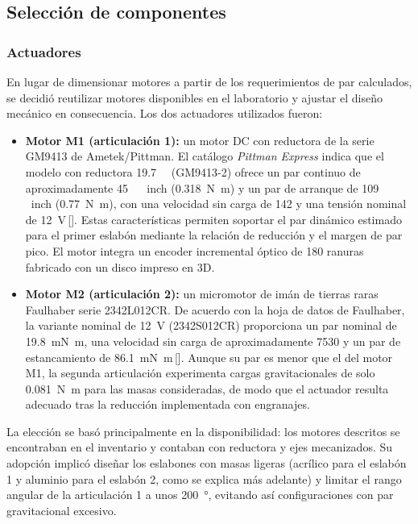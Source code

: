 \documentclass[11pt,a4paper]{article}
\begin{document}
\subsection{Selección de componentes}

\subsubsection{Actuadores}

En lugar de dimensionar motores a partir de los requerimientos de par calculados, se decidió reutilizar motores disponibles en el laboratorio y ajustar el diseño mecánico en consecuencia.  Los dos actuadores utilizados fueron:

\begin{itemize}
  \item \textbf{Motor M1 (articulación 1):} un motor DC con reductora de la serie GM9413 de Ametek/Pittman.  El catálogo \textit{Pittman Express} indica que el modelo con reductora \SI{19.7}{\colon{}} (GM9413‑2) ofrece un par continuo de aproximadamente \SI{45}{\ounce\,inch} (\SI{0.318}{\newton\metre}) y un par de arranque de \SI{109}{\ounce\,inch} (\SI{0.77}{\newton\metre}), con una velocidad sin carga de \SI{142}{\rpm} y una tensión nominal de \SI{12}{\volt}\,[\!\cite{pittman}].  Estas características permiten soportar el par dinámico estimado para el primer eslabón mediante la relación de reducción y el margen de par pico.  El motor integra un encoder incremental óptico de 180 ranuras fabricado con un disco impreso en 3D.

  \item \textbf{Motor M2 (articulación 2):} un micromotor de imán de tierras raras Faulhaber serie 2342L012CR.  De acuerdo con la hoja de datos de Faulhaber, la variante nominal de \SI{12}{\volt} (2342S012CR) proporciona un par nominal de \SI{19.8}{\milli\newton\metre}, una velocidad sin carga de aproximadamente \SI{7530}{\rpm} y un par de estancamiento de \SI{86.1}{\milli\newton\metre}\,[\!\cite{faulhaber}].  Aunque su par es menor que el del motor M1, la segunda articulación experimenta cargas gravitacionales de solo \SI{0.081}{\newton\metre} para las masas consideradas, de modo que el actuador resulta adecuado tras la reducción implementada con engranajes.
\end{itemize}

La elección se basó principalmente en la disponibilidad: los motores descritos se encontraban en el inventario y contaban con reductora y ejes mecanizados.  Su adopción implicó diseñar los eslabones con masas ligeras (acrílico para el eslabón 1 y aluminio para el eslabón 2, como se explica más adelante) y limitar el rango angular de la articulación 1 a unos \SI{200}{\degree}, evitando así configuraciones con par gravitacional excesivo.
\end{document}
